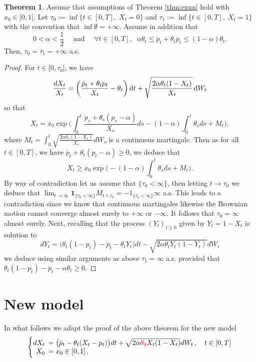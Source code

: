 \documentclass[11pt]{article}
\theoremstyle{definition}
\newtheorem{Thm}[Def]{Theorem}
\newcommand{\red}{\textcolor{red}}
\begin{document}
\begin{Thm}
Assume that assumptions of Theorem \ref{thm:exun} hold with $x_0\in]0,1[$.
Let $\tau_0:=\inf \{t\in[0,T],\; X_t=0\}$ and  $\tau_1:=\inf \{t\in[0,T],\; X_t=1\}$ with the convention that $\inf\emptyset=+\infty$. Assume in addition that
\begin{equation}\label{Assumption:2}
0<\alpha < \frac 12\quad \mbox{ and }\quad \forall  t\in[0,T],\;\; \alpha\theta_t\le \dot p_t +\theta_tp_t \le (1-\alpha)\theta_t \tag{B}. 
\end{equation}
 Then, $\tau_0=\tau_1=+\infty$ a.s.
\end{Thm}
\begin{proof}
For $t\in[0,\tau_0[$, we have 
$$
\frac{dX_t}{X_t}=\left( \frac{\dot p_t +\theta_t p_t}{X_t} - \theta_t\right)\dif t  +\sqrt{\frac{2\alpha \theta_t(1-X_t)}{X_t}} \dif W_t 
$$  
so that
$$
X_t=x_0\exp\Big(\int_0^t \frac{\dot p_s +\theta_s(p_s-\alpha)}{X_s}ds-(1-\alpha)\int_0^t\theta_sds + M_t\Big),
$$
where $M_t=\int_0^t\sqrt{\frac{2\alpha \theta_s(1-X_s)}{X_s}} dW_s$ is a continuous martingale. Then as for all $t\in[0,T]$, we have $\dot p_t +\theta_t(p_t-\alpha)\ge0$, we deduce that
$$
X_t\ge x_0\exp\Big(-(1-\alpha)\int_0^t\theta_sds + M_t\Big).
$$
By way of contradiction let us assume that  $\{\tau_0<\infty\}$, then letting $t\to \tau_0$ we deduce that $\lim_{t\to \infty} \mathbf 1_{\{\tau_0<\infty\}}M_{t\wedge \tau_0}=\mathbf -1_{\{\tau_0<\infty\}}\infty$ a.s. This leads to a contradiction since we know that continuous martingales likewise the Brownian motion cannot converge  almost surely to $+\infty$ or $-\infty$. It follows that $\tau_0=\infty$ almost surely. Next, recalling that  the process $(Y_t)_{t\geq 0}$  given by $Y_t=1-X_t$ is solution to 
$$
dY_t= \big( \theta_t(1-p_t) -\dot p_t - \theta_tY_t  \big)dt  -\sqrt{2\alpha \theta_tY_t(1-Y_t)} dW_t 
$$
we deduce using similar arguments as above 
$\tau_1=\infty$ a.s. provided that $\theta_t(1-p_t) -\dot p_t -\alpha \theta_t\ge 0$.
\end{proof}

\section{New model}
In what follows we adapt the proof of the above theorem for the new model 
\begin{equation}
  \left\{
  \begin{array}{@{}rl@{}}
    dX_t \!\!\!&= \big(\dot p_t - \theta_t (X_t-p_t)  \big)dt  +\sqrt{2 \alpha \red{\theta_0} X_t (1-X_t)} dW_t\,, \quad t\in[0,T] \\
   X_0  \!\!\!&=  x_0\in [0,1] \,,
 \end{array}\right.  \label{eq:model2}
\end{equation}
\end{document}
